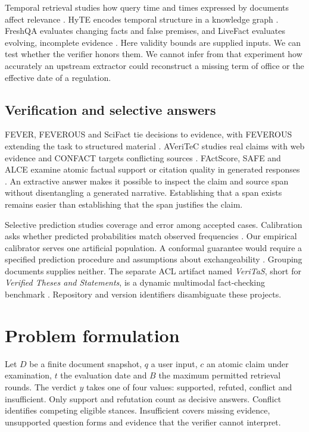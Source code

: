 Temporal retrieval studies how query time and times expressed by documents affect relevance \cite{TempIR}. HyTE encodes temporal structure in a knowledge graph \cite{HyTE}. FreshQA evaluates changing facts and false premises, and LiveFact evaluates evolving, incomplete evidence \cite{FreshLLMs,LiveFact}. Here validity bounds are supplied inputs. We can test whether the verifier honors them. We cannot infer from that experiment how accurately an upstream extractor could reconstruct a missing term of office or the effective date of a regulation.

\subsection{Verification and selective answers}
FEVER, FEVEROUS and SciFact tie decisions to evidence, with FEVEROUS extending the task to structured material \cite{FEVER,FEVEROUS,SciFact}. AVeriTeC studies real claims with web evidence and CONFACT targets conflicting sources \cite{AVeriTeC,CONFACT}. FActScore, SAFE and ALCE examine atomic factual support or citation quality in generated responses \cite{FActScore,SAFE,ALCE}. An extractive answer makes it possible to inspect the claim and source span without disentangling a generated narrative. Establishing that a span exists remains easier than establishing that the span justifies the claim.

Selective prediction studies coverage and error among accepted cases. Calibration asks whether predicted probabilities match observed frequencies \cite{SelectiveNet,Calibration}. Our empirical calibrator serves one artificial population. A conformal guarantee would require a specified prediction procedure and assumptions about exchangeability \cite{Conformal}. Grouping documents supplies neither. The separate ACL artifact named \emph{VeriTaS}, short for \emph{Verified Theses and Statements}, is a dynamic multimodal fact-checking benchmark \cite{VeriTaS}. Repository and version identifiers disambiguate these projects.

\section{Problem formulation}
Let $D$ be a finite document snapshot, $q$ a user input, $c$ an atomic claim under examination, $t$ the evaluation date and $B$ the maximum permitted retrieval rounds. The verdict $y$ takes one of four values: supported, refuted, conflict and insufficient. Only support and refutation count as decisive answers. Conflict identifies competing eligible stances. Insufficient covers missing evidence, unsupported question forms and evidence that the verifier cannot interpret.

